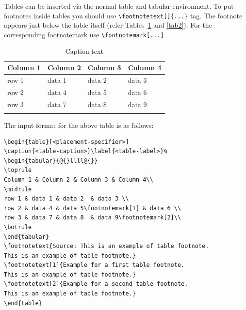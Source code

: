 \documentclass[pdflatex,sn-mathphys-ay]{sn-jnl}%
\theoremstyle{thmstyleone}%
\theoremstyle{thmstyletwo}%
\theoremstyle{thmstylethree}%
\begin{document}
Tables can be inserted via the normal table and tabular environment. To put
footnotes inside tables you should use \verb+\footnotetext[]{...}+ tag.
The footnote appears just below the table itself (refer Tables~\ref{tab1} and \ref{tab2}). 
For the corresponding footnotemark use \verb+\footnotemark[...]+

\begin{table}[h]
\caption{Caption text}\label{tab1}%
\begin{tabular}{@{}llll@{}}
\toprule
Column 1 & Column 2  & Column 3 & Column 4\\
\midrule
row 1    & data 1   & data 2  & data 3  \\
row 2    & data 4   & data 5\footnotemark[1]  & data 6  \\
row 3    & data 7   & data 8  & data 9\footnotemark[2]  \\
\botrule
\end{tabular}
\end{table}

\noindent
The input format for the above table is as follows:

\bigskip
\begin{verbatim}
\begin{table}[<placement-specifier>]
\caption{<table-caption>}\label{<table-label>}%
\begin{tabular}{@{}llll@{}}
\toprule
Column 1 & Column 2 & Column 3 & Column 4\\
\midrule
row 1 & data 1 & data 2	 & data 3 \\
row 2 & data 4 & data 5\footnotemark[1] & data 6 \\
row 3 & data 7 & data 8	 & data 9\footnotemark[2]\\
\botrule
\end{tabular}
\footnotetext{Source: This is an example of table footnote. 
This is an example of table footnote.}
\footnotetext[1]{Example for a first table footnote.
This is an example of table footnote.}
\footnotetext[2]{Example for a second table footnote. 
This is an example of table footnote.}
\end{table}
\end{verbatim}
\bigskip
\end{document}
